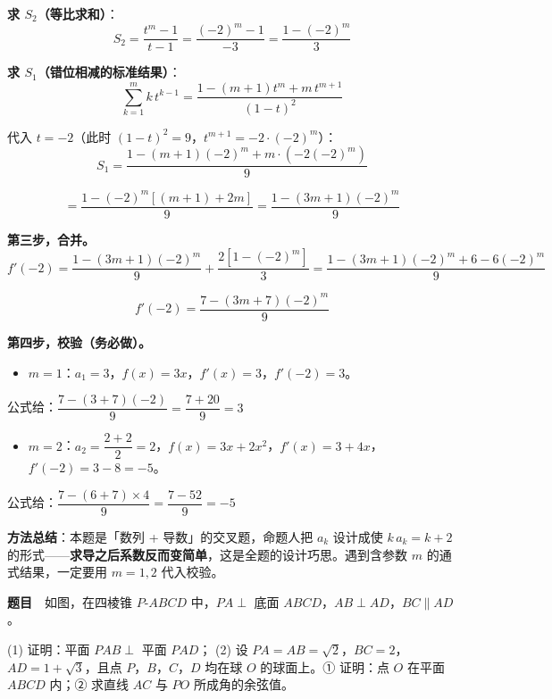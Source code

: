 \textbf{求 $S_2$（等比求和）}：
\[S_2=\frac{t^m-1}{t-1}=\frac{(-2)^m-1}{-3}=\frac{1-(-2)^m}{3}\]

\textbf{求 $S_1$（错位相减的标准结果）}：
\[\sum_{k=1}^{m}k\,t^{k-1}=\frac{1-(m+1)t^{m}+m\,t^{m+1}}{(1-t)^2}\]

代入 $t=-2$（此时 $(1-t)^2=9$，$t^{m+1}=-2\cdot(-2)^m$）：
\[S_1=\frac{1-(m+1)(-2)^m+m\cdot\left(-2(-2)^m\right)}{9}\]

\[=\frac{1-(-2)^m\left[(m+1)+2m\right]}{9}=\frac{1-(3m+1)(-2)^m}{9}\]

\textbf{第三步，合并。}
\[f'(-2)=\frac{1-(3m+1)(-2)^m}{9}+\frac{2\left[1-(-2)^m\right]}{3}=\frac{1-(3m+1)(-2)^m+6-6(-2)^m}{9}\]

\[\boxed{f'(-2)=\frac{7-(3m+7)(-2)^m}{9}}\]

\textbf{第四步，校验（务必做）。}

\begin{itemize}
\item $m=1$：$a_1=3$，$f(x)=3x$，$f'(x)=3$，$f'(-2)=3$。
\end{itemize}
  公式给：$\dfrac{7-(3+7)(-2)}{9}=\dfrac{7+20}{9}=3$ 
\begin{itemize}
\item $m=2$：$a_2=\dfrac{2+2}{2}=2$，$f(x)=3x+2x^2$，$f'(x)=3+4x$，$f'(-2)=3-8=-5$。
\end{itemize}
  公式给：$\dfrac{7-(6+7)\times4}{9}=\dfrac{7-52}{9}=-5$ 

\begin{gktip}
\textbf{方法总结}：本题是「数列 + 导数」的交叉题，命题人把 $a_k$ 设计成使 $k\,a_k=k+2$ 的形式——\textbf{求导之后系数反而变简单}，这是全题的设计巧思。遇到含参数 $m$ 的通式结果，一定要用 $m=1,2$ 代入校验。
\end{gktip}

\par\medskip


\textbf{题目}　如图，在四棱锥 $P\text{-}ABCD$ 中，$PA\perp$ 底面 $ABCD$，$AB\perp AD$，$BC\parallel AD$。

\begin{center}\end{center}

  (1) 证明：平面 $PAB\perp$ 平面 $PAD$；
  (2) 设 $PA=AB=\sqrt2$，$BC=2$，$AD=1+\sqrt3$，且点 $P$，$B$，$C$，$D$ 均在球 $O$ 的球面上。① 证明：点 $O$ 在平面 $ABCD$ 内；② 求直线 $AC$ 与 $PO$ 所成角的余弦值。

\par\medskip

